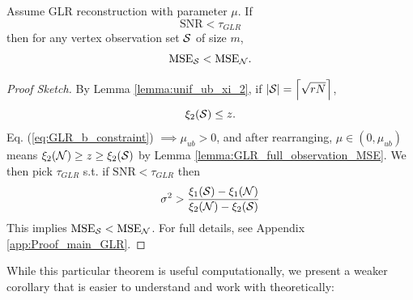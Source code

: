 {\begin{theorem}
    Assume GLR reconstruction with parameter $\mu$. If
    \begin{equation}
        \textrm{SNR} < \tau_{GLR}
        \label{eq:SNR_constraint_GLR}
    \end{equation}
    then for any vertex observation set $\mathcal{S}$ of size $m$,
    \begin{equation}
        \textrm{MSE}_{\mathcal{S}} < \textrm{MSE}_{\mathcal{N}}.
    \end{equation}
    
\end{theorem}
\begin{proof}[Proof Sketch] By Lemma \ref{lemma:unif_ub_xi_2},  if $|\mathcal{S}| = \left\lceil\sqrt{rN}\right\rceil$,
\begin{equation}
\xi_{2}(\mathcal{S}) \leq z.
\end{equation}
Eq. (\ref{eq:GLR_b_constraint}) $\implies \mu_{ub} > 0$, and after rearranging, $\mu \in (0,\mu_{ub})$ means $\xi_{2}(\mathcal{N}) \geq z \geq \xi_{2}(\mathcal{S})$ by Lemma \ref{lemma:GLR_full_observation_MSE}. We then pick $\tau_{GLR}$ s.t. if $\textrm{SNR} < \tau_{GLR}$ then
\begin{equation}
    \sigma^{2} > \frac{\xi_{1}(\mathcal{S}) - \xi_{1}(\mathcal{N})}{\xi_{2}(\mathcal{N}) - \xi_{2}(\mathcal{S})}
\end{equation}
This implies $\textrm{MSE}_{\mathcal{S}} < \textrm{MSE}_{\mathcal{N}}$.
For full details, see Appendix \ref{app:Proof_main_GLR}.
\end{proof}

\iffalse
While this particular theorem is useful computationally, we present a weaker corollary that is easier to understand and work with theoretically:

}
